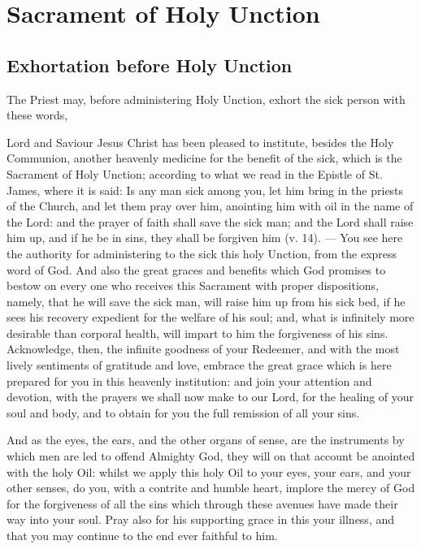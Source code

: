 \fancyhead[RE,LO]{\textit{}}
\section{Sacrament of Holy Unction}
\subsection{Exhortation before Holy Unction}
\begin{secrubric}
    The Priest may, before administering Holy Unction, exhort the sick person with these words,
\end{secrubric}
 Lord and Saviour Jesus Christ has been pleased to institute, besides the Holy Communion, another heavenly medicine for the benefit of the sick, which is the Sacrament of %
Holy Unction; according to what we read in the Epistle of St. James, where it is said: Is any man sick among you, let him bring in the priests of the Church, and let them pray over him, anointing him with oil in the name of the Lord: and the prayer of faith shall save the sick man; and the Lord shall raise him up, and if he be in sins, they shall be forgiven him (v. 14). --- You see here the authority for administering to the sick this holy Unction, from the express word of God. And also the great graces and benefits which God promises to bestow on every one who receives this Sacrament with proper dispositions, namely, that he will save the sick man, will raise him up from his sick bed, if he sees his recovery expedient for the welfare of his soul; and, what is infinitely more desirable than corporal health, will impart to him the forgiveness of his sins. Acknowledge, then, the infinite goodness of your Redeemer, and with the most lively sentiments of gratitude and love, embrace the great grace which is here prepared for you in this heavenly institution: and join your attention and devotion, with the prayers we shall now make to our Lord, for the healing of your soul and body, and to obtain for you the full remission of all your sins.\par
And as the eyes, the ears, and the other organs of sense, are the instruments by which men are led to offend Almighty God, they will on that account be anointed with the holy Oil: whilst we apply this holy Oil to your eyes, your ears, and your other senses, do you, with a contrite and humble heart, implore the mercy of God for the forgiveness of all the sins which through these avenues have made their way into your soul. Pray also for his supporting grace in this your illness, and that you may continue to the end ever faithful to him.
